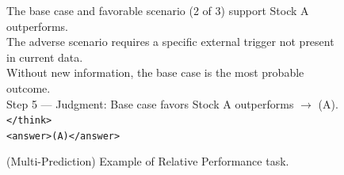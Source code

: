 \begin{figure}[h]
\begin{minipage}{0.95\textwidth}
{{The base case and favorable scenario (2 of 3) support Stock A outperforms. \\
The adverse scenario requires a specific external trigger not present in current data. \\
Without new information, the base case is the most probable outcome. \\[6pt]
Step 5 --- Judgment: Base case favors Stock A outperforms $\rightarrow$ (A). \\[4pt]
\texttt{</think>} \\
\texttt{<answer>(A)</answer>}
}}
\end{minipage}
\caption{(Multi-Prediction) Example of Relative Performance task.}
\vspace{15pt}
\end{figure}

